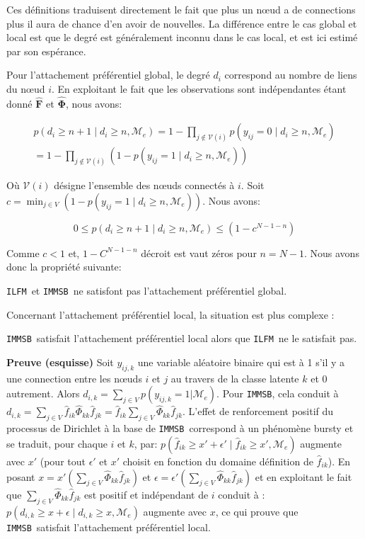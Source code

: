 \documentclass[french]{hermes-journal}
\newcommand{\ilfm}{\texttt{ILFM}}
\newcommand{\immsb}{\texttt{IMMSB}}
\newcommand{\pr}{p}
\newcommand{\mat}[1]{\bm{#1}}
\begin{document}
Ces définitions traduisent directement le fait que plus un n\oe{}ud a de connections plus il aura de chance d'en avoir de nouvelles. La différence entre le cas global et local est que le degré est généralement inconnu dans le cas local, et est ici estimé par son espérance.

Pour l'attachement préférentiel global, le degré $d_i$ correspond au nombre de liens du n\oe{}ud $i$. En exploitant le fait que les observations sont indépendantes étant donné $\mat{\hat{F}}$ et $\mat{\hat{\Phi}}$, nous avons:


\begin{align}
\pr(d_{i} \ge n+1 \mid d_{i} \ge n, \mathcal{M}_e) = 1 - \prod_{j \notin \mathcal{V}(i)} p(y_{ij} = 0 \mid d_{i} \ge n, \mathcal{M}_e) \nonumber \\
= 1 - \prod_{j \notin \mathcal{V}(i)} (1 - p(y_{ij} = 1 \mid d_{i} \ge n, \mathcal{M}_e)) \nonumber
\end{align}

Où $\mathcal{V}(i)$ désigne l'ensemble des n\oe{}uds connectés à $i$. Soit $c=\min_{j \in V}  (1-p(y_{ij} = 1 \mid d_{i} \ge n, \mathcal{M}_e))$. Nous avons:

\[
0 \le \pr(d_{i} \ge n+1 \mid d_{i} \ge n, \mathcal{M}_e) \le (1 - c^{N-1-n})
\]

Comme $c < 1$ et, $1- C^{N-1-n}$ décroit est vaut zéros pour $n=N-1$. Nous avons donc la propriété suivante:

\begin{proposition}[]
\label{pref-attch-glob}
\ilfm\ et \immsb\ ne satisfont pas l'attachement préférentiel global.
\end{proposition}

Concernant l'attachement préférentiel local, la situation est plus complexe :

\begin{proposition}[]
\label{pref-attch-loc}
\immsb\ satisfait l'attachement préférentiel local alors que \ilfm\ ne le satisfait pas.
\end{proposition}

\noindent \textbf{Preuve (esquisse)} Soit $y_{ij,k}$ une variable aléatoire binaire qui est à 1 s'il y a   une connection entre les n\oe{}uds $i$ et $j$ au travers de la classe latente $k$ et 0 autrement.
Alors $d_{i,k} = \sum_{j \in V} \pr(y_{ij,k} =1 | \mathcal{M}_e)$.
Pour \immsb, cela conduit à $d_{i,k} = \sum_{j \in V} \hat{f}_{ik} \hat{\Phi}_{kk} \hat{f}_{jk} = \hat{f}_{ik} \sum_{j \in V} \hat{\Phi}_{kk} \hat{f}_{jk}$.
L'effet de renforcement positif du processus de Dirichlet \cite{HDP} à la base de \immsb\ correspond à un phénomène bursty et se traduit, pour chaque $i$ et $k$, par: $\pr(\hat{f}_{ik} \ge x'+\epsilon' \mid \hat{f}_{ik} \ge x',\mathcal{M}_e)$ augmente avec  $x'$ (pour tout $\epsilon'$ et $x'$ choisit en fonction du domaine définition de  $\hat{f}_{ik}$).
En posant $x=x'(\sum_{j\in V} \hat{\Phi}_{kk} \hat{f}_{jk})$ et $\epsilon = \epsilon'(\sum_{j\in V} \hat{\Phi}_{kk} \hat{f}_{jk})$ et en exploitant le fait que $\sum_{j\in V} \hat{\Phi}_{kk} \hat{f}_{jk}$ est positif et indépendant de $i$ conduit à : $\pr(d_{i,k} \ge x+\epsilon \mid d_{i,k} \ge x, \mathcal{M}_e)$ augmente avec $x$, ce qui prouve que \immsb\ satisfait l'attachement préférentiel local.
\end{document}
